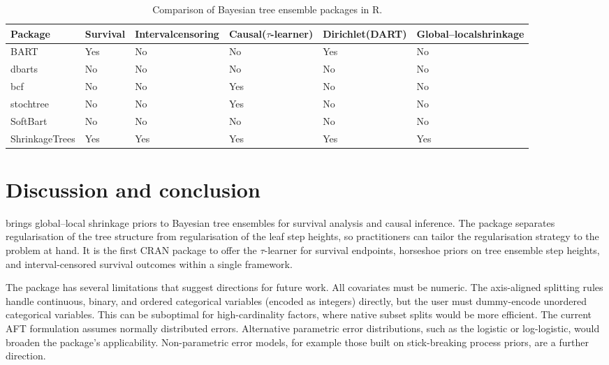 \begin{table}[!h]
\centering
\caption{\label{tab:pkg-comparison}Comparison of Bayesian tree ensemble packages in R.}
\centering
\fontsize{9}{11}\selectfont
\begin{tabular}[t]{>{\raggedright\arraybackslash}p{2.2cm}>{\raggedright\arraybackslash}p{1.8cm}>{\raggedright\arraybackslash}p{1.8cm}>{\raggedright\arraybackslash}p{1.8cm}>{\raggedright\arraybackslash}p{1.8cm}>{\raggedright\arraybackslash}p{1.8cm}}
\toprule
Package & Survival & Interval\newline censoring & Causal\newline ($\tau$-learner) & Dirichlet\newline (DART) & Global--local\newline shrinkage\\
\midrule
BART & Yes & No & No & Yes & No\\
dbarts & No & No & No & No & No\\
bcf & No & No & Yes & No & No\\
stochtree & No & No & Yes & No & No\\
SoftBart & No & No & No & No & No\\
\addlinespace
ShrinkageTrees & Yes & Yes & Yes & Yes & Yes\\
\bottomrule
\end{tabular}
\end{table}

\section{Discussion and conclusion}\label{discussion-and-conclusion}

 brings global--local shrinkage priors to Bayesian tree ensembles for survival analysis and causal inference. The package separates regularisation of the tree structure from regularisation of the leaf step heights, so practitioners can tailor the regularisation strategy to the problem at hand. It is the first CRAN package to offer the \(\tau\)-learner for survival endpoints, horseshoe priors on tree ensemble step heights, and interval-censored survival outcomes within a single framework.

The package has several limitations that suggest directions for future work. All covariates must be numeric. The axis-aligned splitting rules handle continuous, binary, and ordered categorical variables (encoded as integers) directly, but the user must dummy-encode unordered categorical variables. This can be suboptimal for high-cardinality factors, where native subset splits would be more efficient. The current AFT formulation assumes normally distributed errors. Alternative parametric error distributions, such as the logistic or log-logistic, would broaden the package's applicability. Non-parametric error models, for example those built on stick-breaking process priors, are a further direction.

